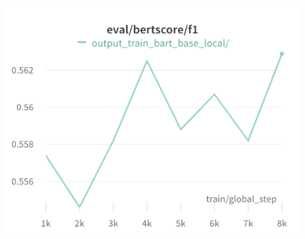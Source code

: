 \begin{figure}[!htb]
\includegraphics[width=\linewidth]{wandb/charts/Section-2-Panel-2-n99sw9rfp}
\caption{}
\endminipage
\end{figure}

